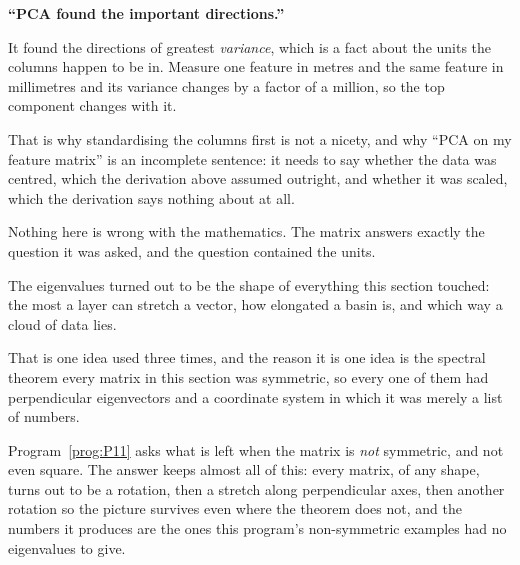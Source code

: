 \begin{trapbox}
\textbf{\enquote{PCA found the important directions.}}

It found the directions of greatest \emph{variance}, which is a fact about the
units the columns happen to be in. Measure one feature in metres and the same
feature in millimetres and its variance changes by a factor of a million, so
the top component changes with it.

That is why standardising the columns first is not a nicety, and why
\enquote{PCA on my feature matrix} is an incomplete sentence: it needs to say
whether the data was centred, which the derivation above assumed outright, and
whether it was scaled, which the derivation says nothing about at all.

Nothing here is wrong with the mathematics. The matrix answers exactly the
question it was asked, and the question contained the units.
\end{trapbox}

\begin{fr}
The eigenvalues turned out to be the shape of everything this section touched:
the most a layer can stretch a vector, how elongated a basin is, and which way
a cloud of data lies.

That is one idea used three times, and the reason it is one idea is the
spectral theorem \dash{} every matrix in this section was symmetric, so every
one of them had perpendicular eigenvectors and a coordinate system in which it
was merely a list of numbers.

Program~\ref{prog:P11} asks what is left when the matrix is \emph{not}
symmetric, and not even square. The answer keeps almost all of this: every
matrix, of any shape, turns out to be a rotation, then a stretch along
perpendicular axes, then another rotation \dash{} so the picture survives even
where the theorem does not, and the numbers it produces are the ones this
program's non-symmetric examples had no eigenvalues to give.
\end{fr}

